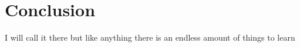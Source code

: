 \section*{Conclusion}
I will call it there but like anything there is an endless amount of things to learn